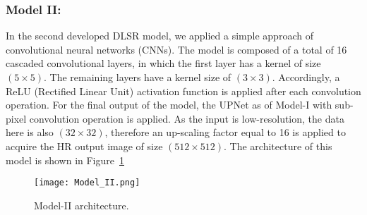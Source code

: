 \subsubsection{Model II:}
In the second developed DLSR model, we applied a simple approach of convolutional neural networks (CNNs). 
The model is composed of a total of 16 cascaded convolutional layers, in which the first layer has a kernel of size \((5\times 5)\).
The remaining layers have a kernel size of \((3\times 3)\). 
Accordingly, a ReLU (Rectified Linear Unit) activation function is applied 
after each convolution operation.
For the final output of the model, the UPNet as of Model-I with sub-pixel 
convolution operation is applied. 
As the input is low-resolution, the data here is also \((32\times 32)\), therefore an up-scaling factor equal to 16 is applied to acquire the HR output image of size \((512\times 512)\). 
The architecture of this model is shown in Figure~\ref{fig:Model_II}
\begin{figure} [ht!]
	\begin{center}
		\texttt{[image: Model\_II.png]}
	\end{center}
	\caption{Model-II architecture.} 
	\label{fig:Model_II}
\end{figure}
